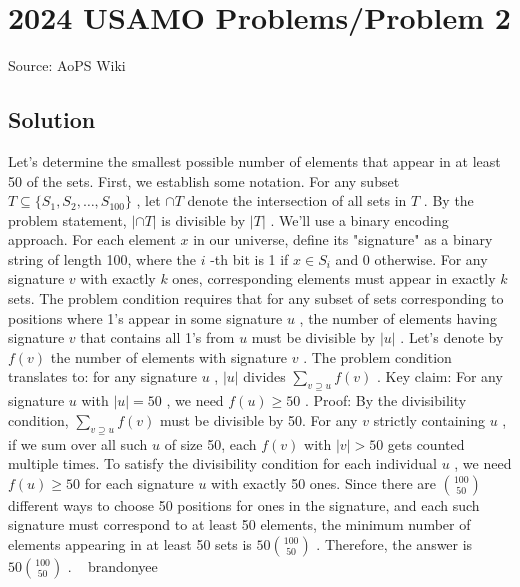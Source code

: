 \documentclass[12pt]{article}
\begin{document}
\section*{{2024 USAMO Problems/Problem 2}}
Source: AoPS Wiki

\subsection*{Solution}
Let's determine the smallest possible number of elements that appear in at least 50 of the sets. First, we establish some notation. For any subset $T \subseteq \{S_1, S_2, \ldots, S_{100}\}$ , let $\cap T$ denote the intersection of all sets in $T$ . By the problem statement, $|\cap T|$ is divisible by $|T|$ . We'll use a binary encoding approach. For each element $x$ in our universe, define its "signature" as a binary string of length 100, where the $i$ -th bit is 1 if $x \in S_i$ and 0 otherwise. For any signature $v$ with exactly $k$ ones, corresponding elements must appear in exactly $k$ sets. The problem condition requires that for any subset of sets corresponding to positions where 1's appear in some signature $u$ , the number of elements having signature $v$ that contains all 1's from $u$ must be divisible by $|u|$ . Let's denote by $f(v)$ the number of elements with signature $v$ . The problem condition translates to: for any signature $u$ , $|u|$ divides $\sum_{v \supseteq u} f(v)$ . Key claim: For any signature $u$ with $|u| = 50$ , we need $f(u) \geq 50$ . Proof: By the divisibility condition, $\sum_{v \supseteq u} f(v)$ must be divisible by 50. For any $v$ strictly containing $u$ , if we sum over all such $u$ of size 50, each $f(v)$ with $|v| > 50$ gets counted multiple times. To satisfy the divisibility condition for each individual $u$ , we need $f(u) \geq 50$ for each signature $u$ with exactly 50 ones. Since there are $\binom{100}{50}$ different ways to choose 50 positions for ones in the signature, and each such signature must correspond to at least 50 elements, the minimum number of elements appearing in at least 50 sets is $50 \binom{100}{50}$ . Therefore, the answer is $\boxed{50 \binom{100}{50}}$ . ~ brandonyee
\end{document}
